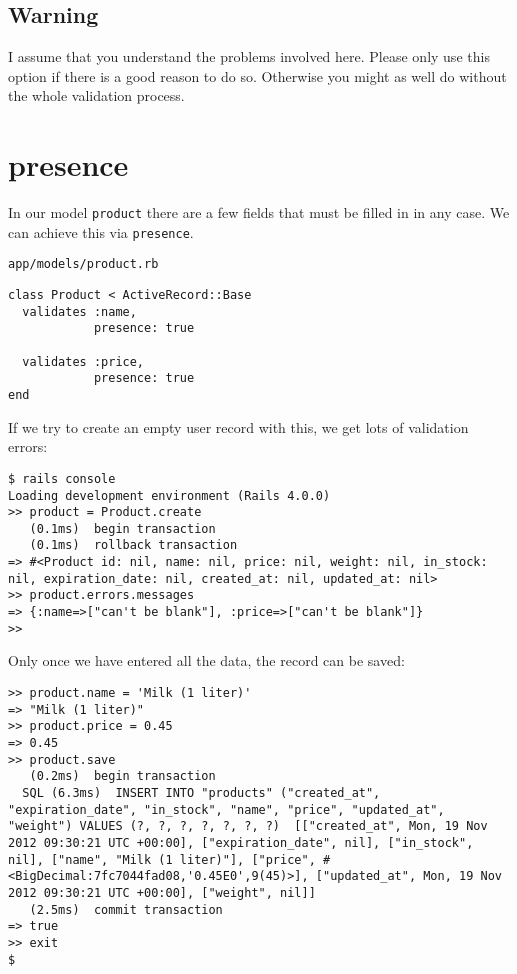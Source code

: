 \documentclass[a4paper]{book}
\begin{document}
\subsection{Warning}\label{warning-6}

I assume that you understand the problems involved here. Please only use this option if there is a good reason to do so. Otherwise you might as well do without the whole validation process.

\section{presence}\label{presence}

In our model \texttt{product} there are a few fields that must be filled in in any case. We can achieve this via \texttt{presence}.

\texttt{app/models/product.rb}

\begin{shaded}\begin{verbatim}
class Product < ActiveRecord::Base
  validates :name,
            presence: true

  validates :price,
            presence: true
end
\end{verbatim}\end{shaded}

If we try to create an empty user record with this, we get lots of validation errors:

\begin{shaded}\begin{verbatim}
$ rails console
Loading development environment (Rails 4.0.0)
>> product = Product.create
   (0.1ms)  begin transaction
   (0.1ms)  rollback transaction
=> #<Product id: nil, name: nil, price: nil, weight: nil, in_stock: nil, expiration_date: nil, created_at: nil, updated_at: nil>
>> product.errors.messages
=> {:name=>["can't be blank"], :price=>["can't be blank"]}
>>
\end{verbatim}\end{shaded}

Only once we have entered all the data, the record can be saved:

\begin{shaded}\begin{verbatim}
>> product.name = 'Milk (1 liter)'
=> "Milk (1 liter)"
>> product.price = 0.45
=> 0.45
>> product.save
   (0.2ms)  begin transaction
  SQL (6.3ms)  INSERT INTO "products" ("created_at", "expiration_date", "in_stock", "name", "price", "updated_at", "weight") VALUES (?, ?, ?, ?, ?, ?, ?)  [["created_at", Mon, 19 Nov 2012 09:30:21 UTC +00:00], ["expiration_date", nil], ["in_stock", nil], ["name", "Milk (1 liter)"], ["price", #<BigDecimal:7fc7044fad08,'0.45E0',9(45)>], ["updated_at", Mon, 19 Nov 2012 09:30:21 UTC +00:00], ["weight", nil]]
   (2.5ms)  commit transaction
=> true
>> exit
$
\end{verbatim}\end{shaded}
\end{document}
